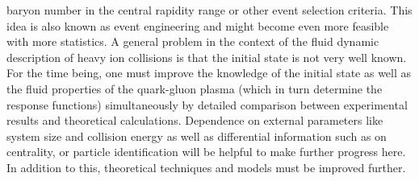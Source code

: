   baryon number  in the central rapidity range or other event selection criteria. 
This idea is also known as event engineering and might become even more feasible 
  with more statistics.
A general problem in the context of the fluid dynamic description of heavy 
  ion collisions is that the initial state is not very well known. 
For the time being,  one must improve the knowledge of the initial state 
  as well as the fluid properties of the quark-gluon plasma (which in turn 
  determine the response functions) simultaneously by detailed comparison 
  between experimental results and theoretical calculations. 
Dependence on external parameters like system size and collision energy as 
  well as differential information such as on centrality, or particle 
  identification will be helpful to make further progress here. 
In addition to this,  theoretical techniques and models must be improved further.



